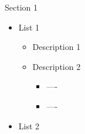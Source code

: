 \begin{frame}{Section 1}
    \begin{itemize}
        \item List 1
        \begin{itemize}
            \item Description 1
            \item Description 2
            \begin{itemize}
                \item ----
                \item ----
            \end{itemize}
        \end{itemize}
        \item List 2
    \end{itemize}
\end{frame}